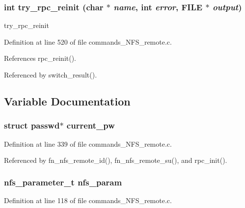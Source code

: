 \subsubsection{\setlength{\rightskip}{0pt plus 5cm}int try\_\-rpc\_\-reinit (char $\ast$ {\em name}, int {\em error}, FILE $\ast$ {\em output})}\label{commands__NFS__remote_8c_a31}


try\_\-rpc\_\-reinit 

Definition at line 520 of file commands\_\-NFS\_\-remote.c.

References rpc\_\-reinit().

Referenced by switch\_\-result().

\subsection{Variable Documentation}
\subsubsection{\setlength{\rightskip}{0pt plus 5cm}struct passwd$\ast$ {\bf current\_\-pw}}\label{commands__NFS__remote_8c_a12}




Definition at line 339 of file commands\_\-NFS\_\-remote.c.

Referenced by fn\_\-nfs\_\-remote\_\-id(), fn\_\-nfs\_\-remote\_\-su(), and rpc\_\-init().
\subsubsection{\setlength{\rightskip}{0pt plus 5cm}nfs\_\-parameter\_\-t {\bf nfs\_\-param}}\label{commands__NFS__remote_8c_a5}




Definition at line 118 of file commands\_\-NFS\_\-remote.c.